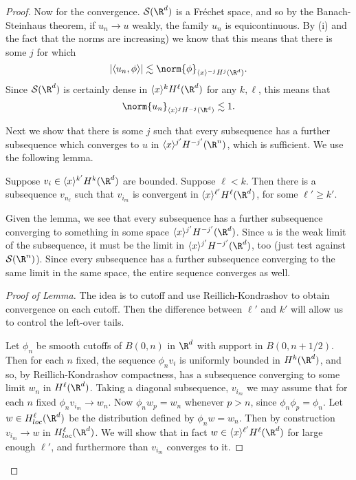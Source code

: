 \documentclass[12pt]{article}
\begin{document}
\begin{proof}
Now for the convergence. $\mathcal S(\R^d)$ is a Fr\'echet space, and so by the Banach-Steinhaus theorem, if $u_n \to u$ weakly, the family $u_n$ is equicontinuous. By (i) and the fact that the norms are increasing) we know that this means that there is some $j$ for which 
\[|\langle u_n,\phi\rangle| \lesssim \norm{\phi}_{\langle x \rangle^{-j}H^j(\R^d)}.\]
Since $\mathcal S(\R^d)$ is certainly dense in $\langle x\rangle^{k}H^{\ell}(\R^d)$ for any $k,\ell$, this means that
\[\norm{u_n}_{\langle x \rangle^{j}H^{-j}(\R^d)} \lesssim 1.\]


Next we show that there is some $j$ such that every subsequence has a further subsequence which converges to $u$ in $\langle x \rangle^{j'}H^{-j'}(\R^n)$, which is sufficient. We use the following lemma.
\begin{lem} Suppose $v_i \in \langle x \rangle^{k'}H^{k}(\R^d)$ are bounded. Suppose $\ell < k$. Then there is a subsequence $v_{n_\ell}$ such that $v_{i_m}$ is convergent in $\langle x \rangle^{\ell'}H^{\ell}(\R^d)$, for some $\ell' \geq k'$.\end{lem}
Given the lemma, we see that every subsequence has a further subsequence converging to something in some space $\langle x \rangle^{j'}H^{-j'}(\R^d)$. Since $u$ is the weak limit of the subsequence, it must be the limit in $\langle x \rangle^{j'}H^{-j'}(\R^d)$, too (just test against $\mathcal S(\R^n)$). Since every subsequence has a further subsequence converging to the same limit in the same space, the entire sequence converges as well.
\begin{proof}[Proof of Lemma]The idea is to cutoff and use Reillich-Kondrashov to obtain convergence on each cutoff. Then the difference between $\ell'$ and $k'$ will allow us to control the left-over tails.

Let $\phi_n$ be smooth cutoffs of $B(0,n)$ in $\R^d$ with support in $B(0,n+1/2)$. Then for each $n$ fixed, the sequence $\phi_nv_i$ is uniformly bounded in $H^k(\R^d)$, and so, by Reillich-Kondrashov compactness, has a subsequence converging to some limit $w_n$ in $H^\ell(\R^d)$. Taking a diagonal subsequence, $v_{i_m}$ we may assume that for each $n$ fixed $\phi_nv_{i_m} \to w_n$. Now $\phi_nw_p = w_n$ whenever $p > n$, since $\phi_n\phi_p = \phi_n$. Let $w \in H^\ell_{loc}(\R^d)$ be the distribution defined by $\phi_nw = w_n$. Then by construction $v_{i_m} \to w$ in $H^\ell_{loc}(\R^d)$. We will show that in fact $w \in \langle x \rangle^{\ell'}H^{\ell}(\R^d)$ for large enough $\ell'$, and furthermore than $v_{i_m}$ converges to it.


\end{proof}
\end{proof}
\end{document}
